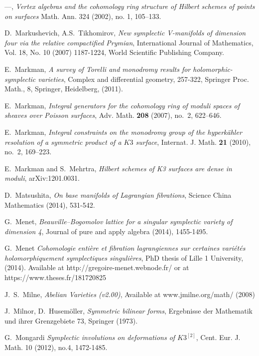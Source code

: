 \begin{thebibliography}{10}
---, \emph{Vertex algebras and the cohomology ring structure of 
  Hilbert schemes of points on surfaces} Math. Ann. 324 (2002), no. 1, 105--133.  
  
D.~Markushevich, A.S.~Tikhomirov,
\emph{ New symplectic V-manifolds of dimension four via the relative compactified Prymian},
International Journal of Mathematics, Vol. 18, No. 10 (2007) 1187-1224,
World Scientific Publishing Company.  
  
E.~Markman,
\emph{ A survey of Torelli and monodromy results for holomorphic-symplectic varieties},
Complex and differential geometry,
257-322, Springer Proc. Math., 8, Springer, Heidelberg, (2011).  
  
E.~Markman, \emph{Integral generators for the cohomology ring of moduli spaces of
  sheaves over Poisson surfaces}, Adv. Math. \textbf{208} (2007), no.~2,
  622--646.

E.~Markman, \emph{Integral constraints on the monodromy group of the
  hyperk\"ahler resolution of a symmetric product of a {$K3$} surface},
  Internat. J. Math. \textbf{21} (2010), no.~2, 169--223.

E.~Markman and S.~Mehrtra,
\emph{Hilbert schemes of K3 surfaces are dense in moduli},
arXiv:1201.0031.

D.~Matsushita,
\emph{On base manifolds of Lagrangian fibrations},
Science China Mathematics (2014), 531-542.

G.~Menet,
\emph{Beauville--Bogomolov lattice for a singular symplectic variety of dimension 4},
Journal of pure and apply algebra (2014), 1455-1495.

G.~Menet
\emph{Cohomologie enti\`ere et fibration lagrangiennes sur certaines vari\'et\'es holomorphiquement symplectiques singuli\`eres},
PhD thesis of Lille 1 University, (2014). Available at http://gregoire-menet.webnode.fr/ or at https://www.theses.fr/181720825

J.~S.~Milne, \emph{Abelian Varieties (v2.00)}, Available at www.jmilne.org/math/ (2008)  

J.~Milnor, D.~Husem\"oller, \emph{Symmetric bilinear forms}, Ergebnisse der Mathematik
  und ihrer Grenzgebiete 73, Springer (1973).

G.~Mongardi
\emph{Symplectic involutions on deformations of $K3^{[2]}$},
Cent. Eur. J. Math. 
10 (2012), no.4, 1472-1485.


\end{thebibliography}
